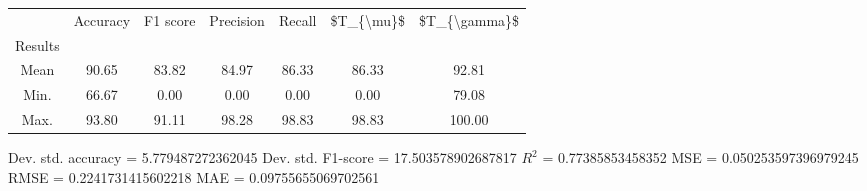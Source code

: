 \begin{tabular}{|c|c|c|c|c|c|c|}
\toprule
{} &  Accuracy &  F1 score &  Precision &  Recall &  \$T\_\{\textbackslash mu\}\$ &  \$T\_\{\textbackslash gamma\}\$ \\
Results &           &           &            &         &            &               \\
\hline
Mean    &     90.65 &     83.82 &      84.97 &   86.33 &      86.33 &         92.81 \\
Min.    &     66.67 &      0.00 &       0.00 &    0.00 &       0.00 &         79.08 \\
Max.    &     93.80 &     91.11 &      98.28 &   98.83 &      98.83 &        100.00 \\
\bottomrule
\end{tabular}

 Dev. std. accuracy = 5.779487272362045
 Dev. std. F1-score = 17.503578902687817
 $R^2$ = 0.77385853458352
 MSE = 0.050253597396979245
 RMSE = 0.2241731415602218
 MAE = 0.09755655069702561